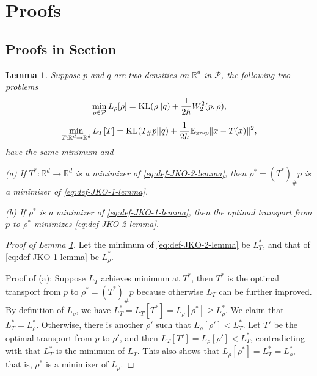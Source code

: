 \documentclass{article}
\newtheorem{lemma}[theorem]{Lemma}
\theoremstyle{remark}
\theoremstyle{plain}
\newcommand{\R}{\mathbb{R}}
\newcommand{\E}{\mathbb{E}}
\newcommand{\calP}{\mathcal{P}}
\begin{document}
{


\appendix

\setcounter{table}{0}
\setcounter{figure}{0}
\renewcommand{\thetable}{A.\arabic{table}}
\renewcommand{\thefigure}{A.\arabic{figure}}
\renewcommand{\thelemma}{A.\arabic{lemma}}



\section{Proofs}\label{sec:proof}

\subsection{Proofs in Section }
%
\begin{lemma}\label{lemma:JKO-by-Tk}
Suppose $p$ and $q$ are two densities on $\R^d$ in $\calP$,  the following two problems
\begin{equation}\label{eq:def-JKO-1-lemma}
\min_{\rho  \in \calP } 
L_\rho[\rho] = 
{\rm KL}( \rho || q) + \frac{1}{2 h} W_2^2( p, \rho),
\end{equation}
\begin{equation}\label{eq:def-JKO-2-lemma}
\min_{T: \R^d \to \R^d} 
L_T[T] =
{\rm KL}(  T_\# p || q) + \frac{1}{2h} \E_{x \sim p} \| x-T(x) \|^{2},
\end{equation}
have the same minimum and 

(a) If $T^*: \R^d \to \R^d$ is a minimizer of \eqref{eq:def-JKO-2-lemma}, 
then $\rho^* = (T^*)_\# p$ is a minimizer of \eqref{eq:def-JKO-1-lemma}.

(b) If $\rho^*$ is a minimizer of \eqref{eq:def-JKO-1-lemma},
then the optimal transport from $p$ to $\rho^*$  minimizes \eqref{eq:def-JKO-2-lemma}.
\end{lemma}

\begin{proof}[Proof of Lemma \ref{lemma:JKO-by-Tk}]

Let the minimum of \eqref{eq:def-JKO-2-lemma} be $L_T^*$, and that of \eqref{eq:def-JKO-1-lemma} be $L_\rho^*$. 

Proof of (a): 
Suppose $L_T$ achieves minimum at $T^*$,
then $T^*$ is the optimal transport from $p$ to $ \rho^* = (T^*)_\# p$ because otherwise $L_T$ can be further improved. 
By definition of $L_\rho$, we have
$L_T^* = L_T[T^*] = L_\rho[ \rho^* ] \ge L_\rho^* $. 
We claim that $L_T^* = L_\rho^*$.
Otherwise,  there is another $\rho'$ such that $L_\rho[\rho'] < L_T^*$. 
Let $T'$ be the optimal transport from $p$ to $\rho'$, and then $L_T[T'] = L_\rho[\rho'] < L_T^*$,
contradicting with that $L_T^*$ is the minimum of $L_T$. This also shows that $ L_\rho[ \rho^* ] = L_T^* = L_\rho^*$, that is, $\rho^*$ is a minimizer of $L_\rho$. 


\end{proof}}
\end{document}
